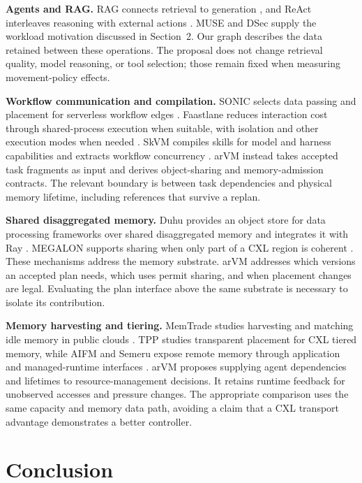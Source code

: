 \documentclass[letterpaper,twocolumn,10pt]{article}
\newcommand{\arvm}{arVM\xspace}
\newcommand{\memtrade}{MemTrade\xspace}
\begin{document}
\textbf{Agents and RAG.} RAG connects retrieval to generation
\cite{rag2020}, and ReAct interleaves reasoning with external actions
\cite{react2023}. MUSE and DSec supply the workload motivation discussed in
Section~2. Our graph describes the data retained between these operations.
The proposal does not change retrieval quality, model reasoning, or tool
selection; those remain fixed when measuring movement-policy effects.

\textbf{Workflow communication and compilation.} SONIC selects data passing
and placement for serverless workflow edges \cite{sonic2021}. Faastlane
reduces interaction cost through shared-process execution when suitable,
with isolation and other execution modes when needed \cite{faastlane2021}.
SkVM compiles skills for model and harness capabilities and extracts workflow
concurrency \cite{skvm2026}. \arvm instead takes accepted task fragments as
input and derives object-sharing and memory-admission contracts. The relevant
boundary is between task dependencies and physical memory lifetime, including
references that survive a replan.

\textbf{Shared disaggregated memory.} Duhu provides an object store for data
processing frameworks over shared disaggregated memory and integrates it with
Ray \cite{duhu2026}. MEGALON supports sharing when only part of a CXL region
is coherent \cite{megalon2026}. These mechanisms address the memory substrate.
\arvm addresses which versions an accepted plan needs, which uses permit
sharing, and when placement changes are legal. Evaluating the plan interface
above the same substrate is necessary to isolate its contribution.

\textbf{Memory harvesting and tiering.} \memtrade studies harvesting and
matching idle memory in public clouds \cite{memtrade2021}. TPP studies
transparent placement for CXL tiered memory, while AIFM and Semeru expose
remote memory through application and managed-runtime interfaces
\cite{tpp2023,aifm2020,semeru2020}. \arvm proposes supplying agent dependencies
and lifetimes to resource-management decisions. It retains runtime feedback
for unobserved accesses and pressure changes. The appropriate comparison uses
the same capacity and memory data path, avoiding a claim that a CXL transport
advantage demonstrates a better controller.

\section{Conclusion}\label{sec:conclusion}
\end{document}
